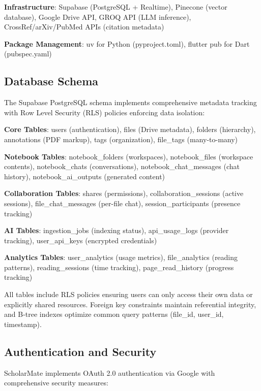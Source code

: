 \documentclass[conference]{IEEEtran}
\begin{document}
\textbf{Infrastructure}: Supabase (PostgreSQL + Realtime), Pinecone (vector database), Google Drive API, GROQ API (LLM inference), CrossRef/arXiv/PubMed APIs (citation metadata)

\textbf{Package Management}: uv for Python (pyproject.toml), flutter pub for Dart (pubspec.yaml)

\subsection{Database Schema}

The Supabase PostgreSQL schema implements comprehensive metadata tracking with Row Level Security (RLS) policies enforcing data isolation:

\textbf{Core Tables}: users (authentication), files (Drive metadata), folders (hierarchy), annotations (PDF markup), tags (organization), file\_tags (many-to-many)

\textbf{Notebook Tables}: notebook\_folders (workspaces), notebook\_files (workspace contents), notebook\_chats (conversations), notebook\_chat\_messages (chat history), notebook\_ai\_outputs (generated content)

\textbf{Collaboration Tables}: shares (permissions), collaboration\_sessions (active sessions), file\_chat\_messages (per-file chat), session\_participants (presence tracking)


\textbf{AI Tables}: ingestion\_jobs (indexing status), api\_usage\_logs (provider tracking), user\_api\_keys (encrypted credentials)

\textbf{Analytics Tables}: user\_analytics (usage metrics), file\_analytics (reading patterns), reading\_sessions (time tracking), page\_read\_history (progress tracking)

All tables include RLS policies ensuring users can only access their own data or explicitly shared resources. Foreign key constraints maintain referential integrity, and B-tree indexes optimize common query patterns (file\_id, user\_id, timestamp).

\subsection{Authentication and Security}

ScholarMate implements OAuth 2.0 authentication via Google with comprehensive security measures:
\end{document}

